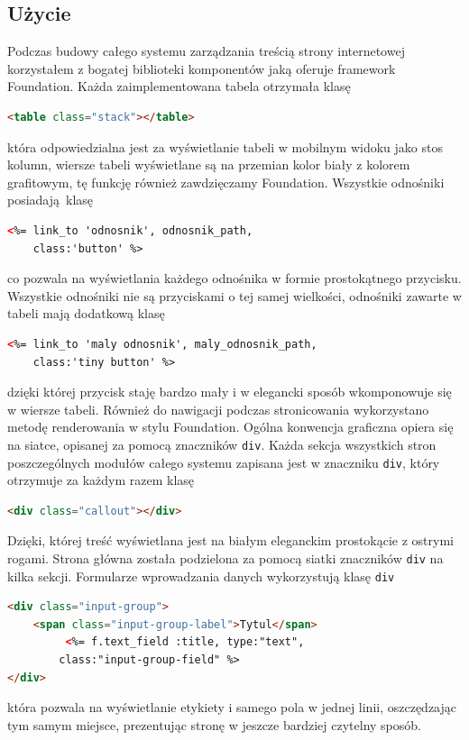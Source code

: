 \documentclass[openright]{xmgr}
\begin{document}
\subsection{Użycie}
Podczas budowy całego systemu zarządzania treścią strony internetowej korzystałem z bogatej biblioteki komponentów jaką oferuje framework Foundation. Każda zaimplementowana tabela otrzymała klasę
\begin{lstlisting}[language=html, caption={Przykładowa tabela}]
<table class="stack"></table>
\end{lstlisting}
która odpowiedzialna jest za wyświetlanie tabeli w mobilnym widoku jako stos kolumn, wiersze tabeli wyświetlane są na przemian kolor biały z kolorem grafitowym, tę funkcję również  zawdzięczamy Foundation. Wszystkie odnośniki \mbox{posiadają klasę}
\begin{lstlisting}[language=html, caption={Przykładowy przycisk}]
<%= link_to 'odnosnik', odnosnik_path,
	class:'button' %>
\end{lstlisting}
co pozwala na wyświetlania każdego odnośnika w formie prostokątnego przycisku. Wszystkie odnośniki nie są przyciskami o tej samej wielkości, odnośniki zawarte w tabeli mają dodatkową klasę
\begin{lstlisting}[language=html, caption={Przykładowy mały przycisk}]
<%= link_to 'maly odnosnik', maly_odnosnik_path,
	class:'tiny button' %>
\end{lstlisting}
dzięki której przycisk staję bardzo mały i w elegancki sposób wkomponowuje się w wiersze tabeli. Również do nawigacji podczas stronicowania wykorzystano metodę renderowania w stylu Foundation. Ogólna konwencja graficzna opiera się na siatce, opisanej za pomocą znaczników \texttt{div}. Każda sekcja wszystkich stron poszczególnych modułów całego systemu zapisana jest w znaczniku \texttt{div}, który otrzymuje za każdym razem klasę
\begin{lstlisting}[language=html, caption={Przykładowy div}]
<div class="callout"></div>
\end{lstlisting}
Dzięki, której treść wyświetlana jest na białym eleganckim prostokącie z ostrymi rogami. Strona główna została podzielona za pomocą siatki znaczników \texttt{div} na kilka sekcji. Formularze wprowadzania danych wykorzystują klasę \texttt{div}
\begin{lstlisting}[language=html, caption={Przykładowe pole tekstowe}]
<div class="input-group">
	<span class="input-group-label">Tytul</span>
         <%= f.text_field :title, type:"text",
		class:"input-group-field" %>
</div>
\end{lstlisting}
która pozwala na wyświetlanie etykiety i samego pola w jednej linii, oszczędzając tym samym miejsce, prezentując stronę w jeszcze bardziej czytelny sposób.
\end{document}
